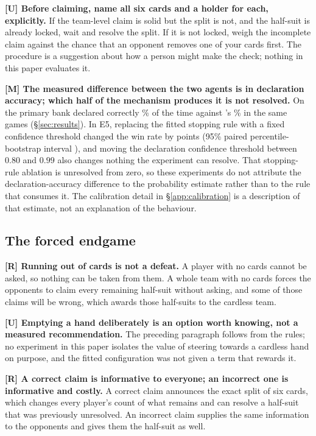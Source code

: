 \textbf{[U] Before claiming, name all six cards and a holder for each,
explicitly.} If the team-level claim is solid but the split is not, and the
half-suit is already locked, wait and resolve the split. If it is not locked,
weigh the incomplete claim against the chance that an opponent removes one of
your cards first. The procedure is a suggestion about how a person might make the
check; nothing in this paper evaluates it.

\textbf{[M] The measured difference between the two agents is in declaration
accuracy; which half of the mechanism produces it is not resolved.} On the
primary bank \vfast{} declared correctly \numVsVthreeDeclAcc\% of the time
against \vthree{}'s \numVthreeDeclAccSame\% in the same games
(\S\ref{sec:results}). In E5, replacing the fitted stopping rule with a fixed
confidence threshold changed the win rate by \numAblStop{} points (95\% paired
percentile-bootstrap interval \numAblStopCI{}), and moving the declaration
confidence threshold between $0.80$ and $0.99$ also changes nothing the
experiment can resolve. That stopping-rule ablation is
unresolved from zero, so these experiments do not attribute the
declaration-accuracy difference to the probability estimate rather than to the
rule that consumes it. The calibration detail in \S\ref{app:calibration} is a
description of that estimate, not an explanation of the behaviour.

\subsection{The forced endgame}
\label{app:human-endgame}

\textbf{[R] Running out of cards is not a defeat.} A player with no cards cannot
be asked, so nothing can be taken from them. A whole team with no cards forces
the opponents to claim every remaining half-suit without asking, and some of
those claims will be wrong, which awards those half-suits to the cardless team.

\textbf{[U] Emptying a hand deliberately is an option worth knowing, not a
measured recommendation.} The preceding paragraph follows from the rules; no
experiment in this paper isolates the value of steering towards a cardless hand
on purpose, and the fitted configuration was not given a term that rewards it.

\textbf{[R] A correct claim is informative to everyone; an incorrect one is
informative and costly.} A correct claim announces the exact split of six cards,
which changes every player's count of what remains and can resolve a half-suit
that was previously unresolved. An incorrect claim supplies the same information
to the opponents and gives them the half-suit as well.

